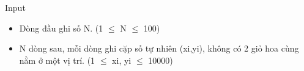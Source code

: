 Input
\begin{itemize}
	\item     Dòng đầu ghi số N. (1  $\le$  N  $\le$  100)   
\end{itemize}
\begin{itemize}
	\item     N dòng sau, mỗi dòng ghi cặp số tự nhiên (xi,yi), không có 2 giỏ hoa cùng nằm ở một vị trí. (1  $\le$  xi, yi  $\le$  10000)   
\end{itemize}